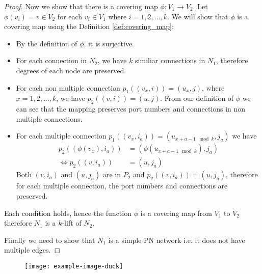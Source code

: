 \begin{proof}
    Now we show that there is a covering map $\phi: V_1 \rightarrow V_2$.
    Let $\phi(v_i) = v \in V_2$ for each $v_i \in V_1$ where $i=1, 2, ..., k$.
    We will show that $\phi$ is a covering map using the Definition \ref{def:covering_map}:
    \begin{itemize}
        \item By the definition of $\phi$, it is surjective.
        \item For each connection in $N_2$, we have $k$ similiar connections in $N_1$, therefore degrees of each node are preserved.
        \item For each non multiple connection $p_1((v_x, i)) = (u_x, j)$, where $x=1, 2, ..., k$, we have $p_2((v, i)) = (u, j)$.
        From our definition of $\phi$ we can see that the mapping preserves port numbers and connections in non multiple connections.
        \item For each multiple connection $p_1((v_{x}, i_a)) = (u_{x+a-1 \mod k}, j_a)$ we have
        \begin{align*}
            p_2((\phi(v_{x}), i_a)) &= (\phi(u_{x+a-1 \mod k}), j_a)\\
            \Leftrightarrow p_2((v, i_a)) &= (u, j_a)
        \end{align*}
        Both $(v, i_a)$ and $(u, j_a)$ are in $P_2$ and $p_2((v, i_a)) = (u, j_a)$, therefore for each multiple connection, the port numbers and connections are preserved.
    \end{itemize}
    Each condition holds, hence the function $\phi$ is a covering map from $V_1$ to $V_2$
    therefore $N_1$ is a $k$-lift of $N_2$.

    Finally we need to show that $N_1$ is a simple PN network i.e. it does not have multiple edges.
\end{proof}

\begin{figure}[H]
 \centering
 \texttt{[image: example-image-duck]}
 \caption{}
 \label{fig:duck2}
\end{figure}



